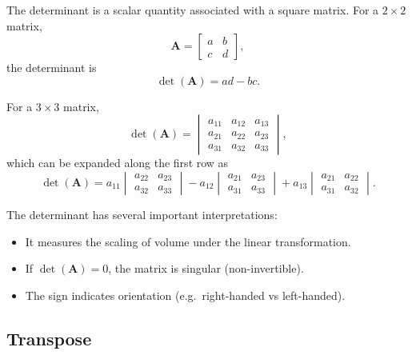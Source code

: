 The determinant is a scalar quantity associated with a square matrix. For a
$2\times2$ matrix,
\begin{equation}
    \mathbf{A} =
    \begin{bmatrix}
        a & b \\
        c & d
    \end{bmatrix},
\end{equation}
the determinant is
\begin{equation}
    \det(\mathbf{A}) = ad - bc.
\end{equation}

For a $3\times3$ matrix,
\begin{equation}
    \det(\mathbf{A}) =
    \begin{vmatrix}
        a_{11} & a_{12} & a_{13} \\
        a_{21} & a_{22} & a_{23} \\
        a_{31} & a_{32} & a_{33}
    \end{vmatrix},
\end{equation}
which can be expanded along the first row as
\begin{equation}
    \det(\mathbf{A}) =
    a_{11}
    \begin{vmatrix}
        a_{22} & a_{23} \\
        a_{32} & a_{33}
    \end{vmatrix}
    - a_{12}
    \begin{vmatrix}
        a_{21} & a_{23} \\
        a_{31} & a_{33}
    \end{vmatrix}
    + a_{13}
    \begin{vmatrix}
        a_{21} & a_{22} \\
        a_{31} & a_{32}
    \end{vmatrix}.
\end{equation}

The determinant has several important interpretations:
\begin{itemize}
    \item It measures the scaling of volume under the linear transformation.
    \item If $\det(\mathbf{A}) = 0$, the matrix is singular (non-invertible).
    \item The sign indicates orientation (e.g.\ right-handed vs left-handed).
\end{itemize}

\subsection{Transpose}

